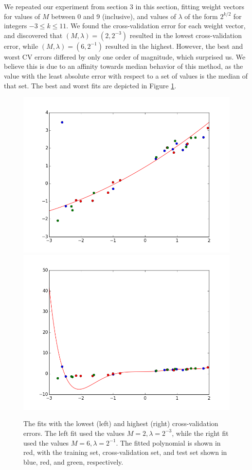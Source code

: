 \documentclass{article}
\begin{document}
We repeated our experiment from section 3 in this section, fitting weight vectors for values of $M$ between 0 and 9 (inclusive), and values of $\lambda$ of the form $2^{k/2}$ for integers $-3 \le k \le 11$. We found the cross-validation error for each weight vector, and discovered that $(M, \lambda) = (2, 2^{-3})$ resulted in the lowest cross-validation error, while $(M, \lambda) = (6, 2^{-1})$ resulted in the highest. However, the best and worst CV errors differed by only one order of magnitude, which surprised us. We believe this is due to an affinity towards median behavior of this method, as the value with the least absolute error with respect to a set of values is the median of that set. The best and worst fits are depicted in Figure \ref{p4figure}.

\begin{figure}
\label{p4figure}
\includegraphics[scale=0.4]{figure4_3.png}
\includegraphics[scale=0.4]{figure4_4.png}
\caption{The fits with the lowest (left) and highest (right) cross-validation errors. The left fit used the values $M=2, \lambda = 2^{-3}$, while the right fit used the values $M=6, \lambda = 2^{-1}$. The fitted polynomial is shown in red, with the training set, cross-validation set, and test set shown in blue, red, and green, respectively.}
\end{figure}
\end{document}
